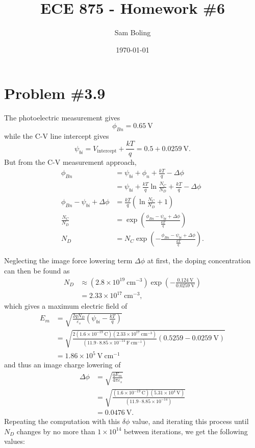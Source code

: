 \documentclass{article}
\title{ECE 875 - Homework \#6}
\author{Sam Boling}
\date{\today}
\begin{document}
\maketitle

\section*{Problem \#3.9}
The photoelectric measurement gives
$$
\phi_{Bn} = 0.65 ~\mathrm{V}
$$
while the C-V line intercept gives
$$
\psi_{bi} = V_{\mathrm{intercept}} + \frac{kT}{q} =  0.5 + 0.0259  ~\mathrm{V}.
$$
But from the C-V measurement approach,
\begin{align*}
\phi_{Bn} &= \psi_{bi} + \phi_n + \frac{kT}{q} - \Delta \phi \\
          &= \psi_{bi} 
           + \frac{kT}{q}\ln\frac{N_C}{N_D}
           + \frac{kT}{q}
           - \Delta \phi \\
\phi_{Bn} - \psi_{bi} + \Delta \phi &= \frac{kT}{q}\left(\ln\frac{N_C}{N_D} + 1\right) \\
\frac{N_C}{N_D} &= \exp\left(\frac{\phi_{Bn} - \psi_{bi} + \Delta \phi}
                                  {\frac{kT}{q}}\right) \\
N_D &= N_C \exp\left(-\frac{\phi_{Bn} - \psi_{bi} + \Delta \phi}{\frac{kT}{q}}\right).
\end{align*}

Neglecting the image force lowering term $\Delta \phi$ at first,
the doping concentration can then be found as
\begin{align*}
N_D &\approx (2.8 \times 10^{19} ~\mathrm{cm}^{-3}) 
             \exp\left(-\frac{0.124 ~\mathrm{V}}{0.0259 ~\mathrm{V}}\right) \\
    &= 2.33 \times 10^{17} ~\mathrm{cm}^{-3},
\end{align*}
which gives a maximum electric field of
\begin{align*}
E_m &= \sqrt{\frac{2 q N_D}{\varepsilon_s}\left(\psi_{bi} - \frac{kT}{q}\right)} \\
    &= \sqrt{\frac{2 (1.6 \times 10^{-19} ~\mathrm{C})
                     (2.33 \times 10^{17} ~\mathrm{cm}^{-3})}
                  {(11.9 \cdot 8.85 \times 10^{-14} ~\mathrm{F}~\mathrm{cm}^{-1})}
             \left(0.5259 - 0.0259 ~\mathrm{V}\right)} \\
    &= 1.86 \times 10^{5} ~\mathrm{V} ~\mathrm{cm}^{-1}
\end{align*}
and thus an image charge lowering of
\begin{align*}
\Delta \phi &= \sqrt{\frac{q E_m}{4 \pi \varepsilon_s}} \\
            &= \sqrt{\frac{(1.6 \times 10^{-19} ~\mathrm{C})
                           (5.31 \times 10^{4} ~\mathrm{V})}
                    {(11.9 \cdot 8.85 \times 10^{-14})}} \\
            &= 0.0476 ~\mathrm{V}.
\end{align*}
Repeating the computation with this $\delta \phi$ value, and iterating this
process until $N_D$ changes by no more than $1 \times 10^{14}$ between iterations,
we get the following values:
\end{document}
